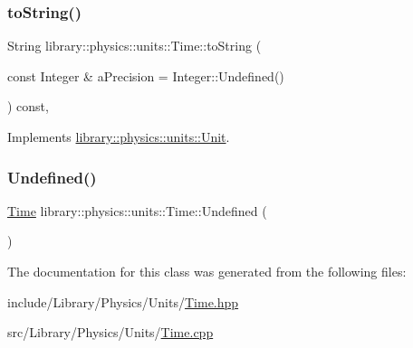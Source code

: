 \subsubsection{\texorpdfstring{to\+String()}{toString()}}
{\footnotesize\ttfamily String library\+::physics\+::units\+::\+Time\+::to\+String (\begin{DoxyParamCaption}\item[{const Integer \&}]{a\+Precision = {\ttfamily Integer\+:\+:Undefined()} }\end{DoxyParamCaption}) const\hspace{0.3cm}{\ttfamily [override]}, {\ttfamily [virtual]}}



Implements \hyperlink{classlibrary_1_1physics_1_1units_1_1_unit_aac05cb6ed1ea7c18c233a3381c81caf8}{library\+::physics\+::units\+::\+Unit}.

\mbox{\label{classlibrary_1_1physics_1_1units_1_1_time_a532c992968408dcb70f5ee94e672c595}} 
\subsubsection{\texorpdfstring{Undefined()}{Undefined()}}
{\footnotesize\ttfamily \hyperlink{classlibrary_1_1physics_1_1units_1_1_time}{Time} library\+::physics\+::units\+::\+Time\+::\+Undefined (\begin{DoxyParamCaption}{ }\end{DoxyParamCaption})\hspace{0.3cm}{\ttfamily [static]}}



The documentation for this class was generated from the following files\+:\begin{DoxyCompactItemize}
\item 
include/\+Library/\+Physics/\+Units/\hyperlink{_units_2_time_8hpp}{Time.\+hpp}\item 
src/\+Library/\+Physics/\+Units/\hyperlink{_units_2_time_8cpp}{Time.\+cpp}\end{DoxyCompactItemize}
